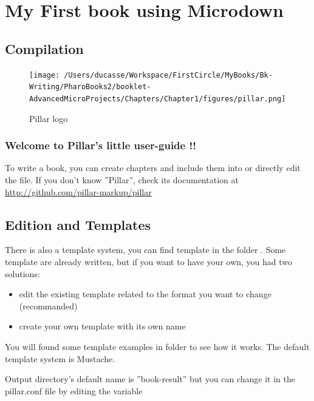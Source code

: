 \documentclass[10pt,twoside,english]{_support/latex/sbabook/sbabook}
\begin{document}
\frontmatter
\pagestyle{plain}

\tableofcontents*
\clearpage\listoffigures

\mainmatter


\part{My First book using Microdown}
\chapter{Compilation}
\begin{figure}[htpb]
\begin{center}
\texttt{[image: /Users/ducasse/Workspace/FirstCircle/MyBooks/Bk-Writing/PharoBooks2/booklet-AdvancedMicroProjects/Chapters/Chapter1/figures/pillar.png]}
\caption{Pillar logo}
\end{center}
\end{figure}


\section{Welcome to Pillar's little user-guide !!}
To write a book, you can create chapters and include them into 
or directly edit the file.
If you don't know ''Pillar'', check its documentation at \href{}{http://github.com/pillar-markup/pillar}\footnotesize{\url{}}

\chapter{Edition and Templates}
There is also a template system, you can find template in the folder .
Some template are already written, but if you want to have your own, you had two solutions:

\begin{itemize}
    \item edit the existing template related to the format you want to change (recommanded)
    \item create your own template with its own name
\end{itemize}

You will found some template examples in  folder to see how it works.
The default template system is Mustache.

Output directory's default name is ''book-result'' but you can change it in the pillar.conf file by editing the variable
\end{document}
